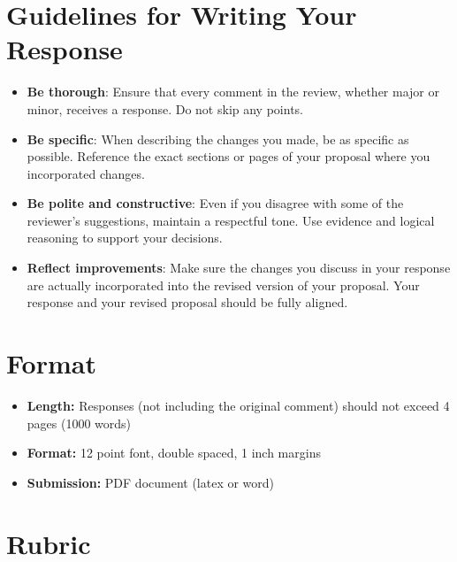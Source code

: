 \documentclass[
]{article}
\begin{document}
\hypertarget{guidelines-for-writing-your-response}{%
\section{Guidelines for Writing Your Response}\label{guidelines-for-writing-your-response}}

\begin{itemize}
\item
  \textbf{Be thorough}: Ensure that every comment in the review, whether major or minor, receives a response. Do not skip any points.
\item
  \textbf{Be specific}: When describing the changes you made, be as specific as possible. Reference the exact sections or pages of your proposal where you incorporated changes.
\item
  \textbf{Be polite and constructive}: Even if you disagree with some of the reviewer's suggestions, maintain a respectful tone. Use evidence and logical reasoning to support your decisions.
\item
  \textbf{Reflect improvements}: Make sure the changes you discuss in your response are actually incorporated into the revised version of your proposal. Your response and your revised proposal should be fully aligned.
\end{itemize}

\hypertarget{format}{%
\section{Format}\label{format}}

\begin{itemize}
\item
  \textbf{Length:} Responses (not including the original comment) should not exceed 4 pages (1000 words)
\item
  \textbf{Format:} 12 point font, double spaced, 1 inch margins
\item
  \textbf{Submission:} PDF document (latex or word)
\end{itemize}

\hypertarget{rubric}{%
\section{Rubric}\label{rubric}}
\end{document}
